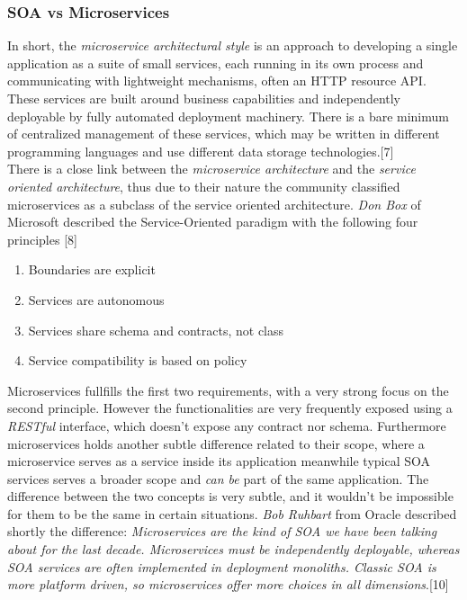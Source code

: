 \begin{itemize}
\subsubsection{SOA vs Microservices}
In short, the \textit{microservice architectural style} is an approach to developing a single
application as a suite of small services, each running in its own process and communicating with
lightweight mechanisms, often an HTTP resource API. These services are built around business capabilities
and independently deployable by fully automated deployment machinery. There is
a bare minimum of centralized management of these services,
which may be written in different programming languages and use different data storage technologies.[7]\\
There is a close link between the \textit{microservice architecture} and the \textit{service oriented architecture},
thus due to their nature the community classified microservices as a subclass of the service oriented architecture.
\textit{Don Box} of Microsoft described the Service-Oriented paradigm with the following four principles [8]

\begin{enumerate}
  \item Boundaries are explicit
  \item Services are autonomous
  \item Services share schema and contracts, not class
  \item Service compatibility is based on policy
\end{enumerate}

Microservices fullfills the first two requirements, with a very strong focus on the second principle.
However the functionalities are very frequently exposed using a \textit{RESTful} interface, which
doesn't expose any contract nor schema. Furthermore microservices holds another subtle difference related to their
scope, where a microservice serves as a service inside its application meanwhile typical SOA services
serves a broader scope and \textit{can be} part of the same application.
The difference between the two concepts is very subtle, and it wouldn't be impossible for them
to be the same in certain situations. \textit{Bob Ruhbart} from Oracle described shortly the difference:
\textit{Microservices are the kind of SOA we have been talking about for the last decade. Microservices must be independently deployable,
whereas SOA services are often implemented in deployment monoliths.
Classic SOA is more platform driven, so microservices offer more choices
in all dimensions}.[10]


\end{itemize}
